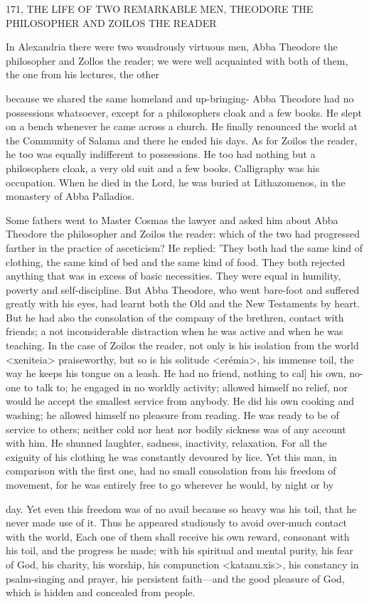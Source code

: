 171, THE LIFE OF TWO REMARKABLE MEN,
THEODORE THE PHILOSOPHER
AND ZOILOS THE READER

In Alexandria there were two wondrously virtuous men, Abba
Theodore the philosopher and Zollos the reader; we were well
acquainted with both of them, the one from his lectures, the other

because we shared the same homeland and up-bringing- Abba
Theodore had no possessions whatsoever, except for a philosopher\textquotesingle s
cloak and a few books. He slept on a bench whenever he came
across a church. He finally renounced the world at the Community
of Salama and there he ended his days. As for Zoilos the reader, he
too was equally indifferent to possessions. He too had nothing but
a philosopher\textquotesingle s cloak, a very old suit and a few books. Calligraphy
was his occupation. When he died in the Lord, he was buried at
Lithazomenos, in the monastery of Abba Palladios.

Some fathers went to Master Cosmas the lawyer and asked him
about Abba Theodore the philosopher and Zoilos the reader: which
of the two had progressed farther in the practice of asceticism? He
replied: 'They both had the same kind of clothing, the same kind of
bed and the same kind of food. They both rejected anything that
was in excess of basic necessities. They were equal in humility,
poverty and self-discipline. But Abba Theodore, who went bare-foot
and suffered greatly with his eyes, had learnt both the Old and the
New Testaments by heart. But he had also the consolation of the
company of the brethren, contact with friends; a not inconsiderable
distraction when he was active and when he was teaching. In the
case of Zoilos the reader, not only is his isolation from the world
<xeniteia> praiseworthy, but so is his solitude <erémia>, his
immense toil, the way he keeps his tongue on a leash. He had no
friend, nothing to cal] his own, no-one to talk to; he engaged in no
worldly activity; allowed himself no relief, nor would he accept the
smallest service from anybody. He did his own cooking and
washing; he allowed himself no pleasure from reading. He was ready
to be of service to others; neither cold nor heat nor bodily sickness
was of any account with him. He shunned laughter, sadness,
inactivity, relaxation. For all the exiguity of his clothing he was
constantly devoured by lice. Yet this man, in comparison with the
first one, had no small consolation from his freedom of movement,
for he was entirely free to go wherever he would, by night or by

day. Yet even this freedom was of no avail because so heavy was his
toil, that he never made use of it. Thus he appeared studiously to
avoid over-much contact with the world, Each one of them shall
receive his own reward, consonant with his toil, and the progress he
made; with his spiritual and mental purity, his fear of God, his
charity, his worship, his compunction <katanu.xis>, his constancy
in psalm-singing and prayer, his persistent faith—and the good
pleasure of God, which is hidden and concealed from people.

